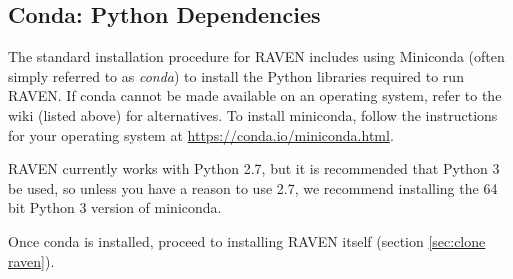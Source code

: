 \subsection{Conda: Python Dependencies}
\label{sec:install conda}

The standard installation procedure for RAVEN includes using Miniconda (often simply referred to as
\emph{conda}) to install the Python libraries required to run RAVEN.  If conda cannot be made available on an
operating system, refer to the wiki (listed above) for alternatives.  To install miniconda, follow the
instructions for your operating system at \url{https://conda.io/miniconda.html}.

\nb RAVEN currently works with Python 2.7, but it is recommended that Python 3 be used, so unless you have a reason to use 2.7, we recommend installing the 64 bit Python 3 version of miniconda.

Once conda is installed, proceed to installing RAVEN itself (section \ref{sec:clone raven}).
